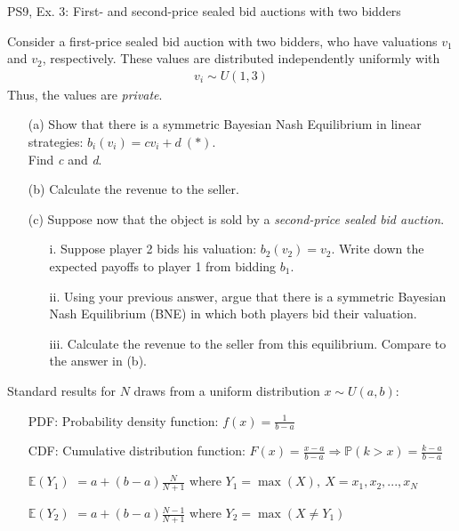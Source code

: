 \begin{frame}{PS9, Ex. 3: First- and second-price sealed bid auctions with two bidders}
    \begin{multicols}{2}
      Consider a first-price sealed bid auction with two bidders, who have valuations $v_1$ and $v_2$, respectively. These values are distributed independently uniformly with
      \begin{align*}
        v_i\sim U(1,3)
      \end{align*}
      Thus, the values are \textit{private}.
      \begin{itemize}
        \item[(a)] Show that there is a symmetric Bayesian Nash Equilibrium in linear strategies: $b_i(v_i) = cv_i + d\ (*)$.\\
                   Find \textit{c} and \textit{d}.
        \item[(b)] Calculate the revenue to the seller.
      \end{itemize}
      \vfill\null\columnbreak
      \begin{itemize}
        \item[(c)] Suppose now that the object is sold by a \textit{second-price sealed bid auction}.
        \begin{itemize}\normalsize
          \item[i.]   Suppose player 2 bids his valuation: $b_2(v_2) = v_2$. Write down the expected payoffs to player 1 from bidding $b_1$.
          \item[ii.]  Using your previous answer, argue that there is a symmetric Bayesian Nash Equilibrium (BNE) in which both players bid their valuation.
          \item[iii.] Calculate the revenue to the seller from this equilibrium. Compare to the answer in (b).
        \end{itemize}
      \end{itemize}
      \vfill\null
    \end{multicols}
    \vspace{-16pt}
    Standard results for $N$ draws from a uniform distribution $x\sim U(a, b):$
    \begin{enumerate}
      \item[PDF:] Probability density function: $f(x)=\frac{1}{b-a}$
      \item[CDF:] Cumulative distribution function: $F(x)=\frac{x-a}{b-a}\Rightarrow\mathbb{P}(k>x)=\frac{k-a}{b-a}$
      \item[$\mathbb{E}(Y_1)$] $=a+(b-a)\frac{N}{N+1}$ where $Y_1=\max(X),\ X=x_1,x_2,...,x_N$
      \item[$\mathbb{E}(Y_2)$] $=a+(b-a)\frac{N-1}{N+1}$ where $Y_2=\max(X\neq Y_1)$
    \end{enumerate}
    \vfill\null
\end{frame}


